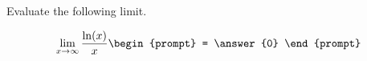 \documentclass{ximera}
\author{Steven Gubkin}
\begin{document}
\begin{exercise}

Evaluate the following limit. %

\[
\lim_{x \to \infty} \frac{\ln(x)}{x} \begin{prompt} = \answer{0} \end{prompt}
\]

\end{exercise}
\end{document}
